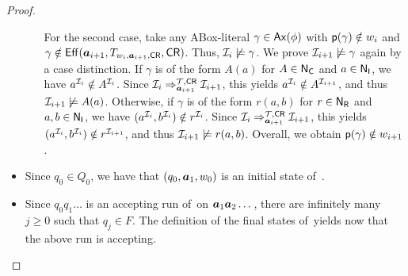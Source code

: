 \begin{proof}
\begin{itemize}
\begin{itemize}
                    For the second case, take any ABox-literal
                    $\gamma\in\operatorname{\mathsf{Ax}}(\phi)$ with $\mathsf{p}(\gamma)\notin w_i$ and
                    $\gamma\notin\operatorname{\mathsf{Eff}}(\boldsymbol a_{i+1},T_{w_i,\boldsymbol a_{i+1},\mathsf{CR}},\mathsf{CR})$.
                    Thus, $\mathcal{I}_i\not\models\gamma$.  We prove
                    $\mathcal{I}_{i+1}\not\models\gamma$ again by a case distinction.
                    If $\gamma$ is of the form $A(a)$ for $A\in\mathsf{N_C}$ and
                    $a\in\mathsf{N_I}$, we have $a^{\mathcal{I}_i}\notin A^{\mathcal{I}_i}$.  Since
                    $\mathcal{I}_i\Rightarrow_{\boldsymbol a_{i+1}}^{\mathcal{T},\mathsf{CR}}\mathcal{I}_{i+1}$, this
                    yields $a^{\mathcal{I}_i}\notin A^{\mathcal{I}_{i+1}}$, and thus
                    $\mathcal{I}_{i+1}\not\models A(a)$.  Otherwise, if $\gamma$ is of
                    the form $r(a,b)$ for $r\in\mathsf{N_R}$ and $a,b\in\mathsf{N_I}$, we have
                    $(a^{\mathcal{I}_i},b^{\mathcal{I}_i})\notin r^{\mathcal{I}_i}$.  Since
                    $\mathcal{I}_i\Rightarrow_{\boldsymbol a_{i+1}}^{\mathcal{T},\mathsf{CR}}\mathcal{I}_{i+1}$, this
                    yields $(a^{\mathcal{I}_i},b^{\mathcal{I}_i})\notin r^{\mathcal{I}_{i+1}}$, and
                    thus $\mathcal{I}_{i+1}\not\models r(a,b)$.
                    Overall, we obtain $\mathsf{p}(\gamma)\notin w_{i+1}$.
            \end{itemize}
        \item Since $q_0\in Q_0$, we have that $(q_0,\boldsymbol a_1,w_0)$ is an initial
            state of~\Nmch.
        \item Since $q_0q_1\dots$ is an accepting run of~\Nmc on
            $\boldsymbol a_1\boldsymbol a_2\dots$, there are infinitely many $j\ge 0$ such that
            $q_j\in F$.  The definition of the final states of~\Nmch yields now
            that the above run is accepting.
    \end{itemize}


\end{proof}
